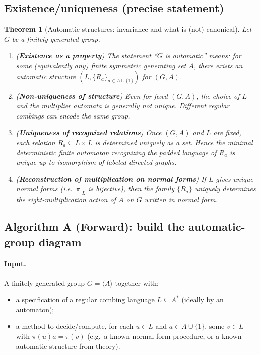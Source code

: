 \documentclass[11pt]{article}
\newtheorem{theorem}{Theorem}[section]
\theoremstyle{definition}
\theoremstyle{plain}
\theoremstyle{remark}
\begin{document}
\subsection*{Existence/uniqueness (precise statement)}
\begin{theorem}[Automatic structures: invariance and what is (not) canonical]\label{thm:automatic-structure}
Let $G$ be a finitely generated group.
\begin{enumerate}[leftmargin=2.2em]
\item (\textbf{Existence as a property}) The statement ``$G$ is automatic'' means: for some (equivalently any) finite symmetric generating set $A$,
there exists an automatic structure $(L,\{R_a\}_{a\in A\cup\{1\}})$ for $(G,A)$.

\item (\textbf{Non-uniqueness of structure}) Even for fixed $(G,A)$, the choice of $L$ and the multiplier automata is generally \emph{not} unique.
Different regular combings can encode the same group.

\item (\textbf{Uniqueness of recognized relations}) Once $(G,A)$ and $L$ are fixed,
each relation $R_a\subseteq L\times L$ is determined uniquely as a set.
Hence the \emph{minimal} deterministic finite automaton recognizing the padded language of $R_a$
is unique up to isomorphism of labeled directed graphs.

\item (\textbf{Reconstruction of multiplication on normal forms}) If $L$ gives \emph{unique} normal forms (i.e.\ $\pi|_L$ is bijective),
then the family $\{R_a\}$ uniquely determines the right-multiplication action of $A$ on $G$ written in normal form.
\end{enumerate}
\end{theorem}

\subsection*{Algorithm A (Forward): build the automatic-group diagram}
\paragraph{Input.}
A finitely generated group $G=\langle A\rangle$ together with:
\begin{itemize}[leftmargin=2em]
\item a specification of a regular combing language $L\subseteq A^*$ (ideally by an automaton);
\item a method to decide/compute, for each $u\in L$ and $a\in A\cup\{1\}$, some $v\in L$ with $\pi(u)a=\pi(v)$
(e.g.\ a known normal-form procedure, or a known automatic structure from theory).
\end{itemize}
\end{document}
